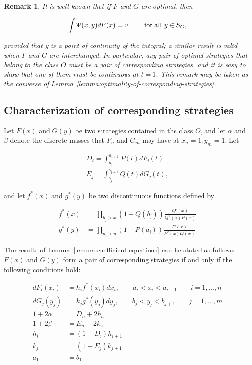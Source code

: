 \documentclass{article}
\newtheorem{remark}{Remark}
\begin{document}
\begin{remark}

It is well known that if $F$ and $G$ are optimal, then

\[
\int \Psi(x, y) dF(x) = v \qquad \textup{ for all } y \in S_G,
\]

provided that $y$ is a point of continuity of the integral; a similar result is
valid when $F$ and $G$ are interchanged. In particular, any pair of optimal
strategies that belong to the class $O$ must be a pair of corresponding
strategies, and it is easy to show that one of them must be continuous at
$t=1$. This remark may be taken as the converse of
Lemma~\ref{lemma:optimality-of-corresponding-strategies}.

\end{remark}

\subsection{Characterization of corresponding strategies}

Let $F(x)$ and $G(y)$ be two strategies contained in the class $O$, and let
$\alpha$ and $\beta$ denote the discrete masses that $F_n$ and $G_m$ may have
at $x_n = 1, y_m=1$. Let

\[
\begin{aligned}
D_i = \int_{a_i}^{a_{i+1}} P(t) dF_i(t) \\
E_j = \int_{b_j}^{b_{j+1}} Q(t) dG_j(t),
\end{aligned}
\]

and let $f^*(x)$ and $g^*(y)$ be two discontinuous functions defined by

\begin{align}
f^*(x) &= \prod_{b_j > x} (1-Q(b_j)) \frac{Q'(x)}{Q^2(x) P(x)}
\label{eqn:characterization-6} \\
g^*(y) &= \prod_{a_i > y} (1-P(a_i)) \frac{P'(x)}{P^2(x) Q(x)} \label{eqn:characterization-7}
\end{align}

The results of Lemma~\ref{lemma:coefficient-equations} can be stated as
follows: $F(x)$ and $G(y)$ form a pair of corresponding strategies if and only
if the following conditions hold:

\begin{align}
dF_i(x_i) &= h_i f^*(x_i) dx_i, \qquad a_i < x_i < a_{i+1} \qquad i=1, \dots, n \label{eqn:characterization-8} \\
dG_j(y_j) &= k_j g^*(y_j) dy_j, \qquad b_j < y_j < b_{j+1} \qquad j=1, \dots, m \label{eqn:characterization-9} \\
1 + 2 \alpha &= D_n + 2h_n \label{eqn:characterization-10} \\
1 + 2 \beta &= E_n + 2k_n \label{eqn:characterization-11} \\
h_i &= (1-D_i) h_{i+1} \label{eqn:characterization-12} \\
k_j &= (1-E_j) k_{j+1} \label{eqn:characterization-13} \\
a_1 &= b_1
\end{align}
\end{document}
